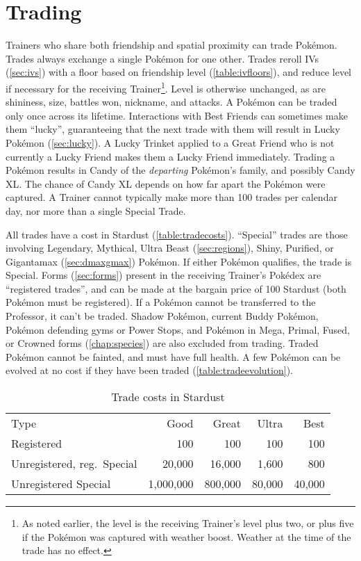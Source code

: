 \section{Trading\label{sec:trades}}
Trainers who share both friendship and spatial proximity can trade Pokémon.
Trades always exchange a single Pokémon for one other.
Trades reroll IVs (\autoref{sec:ivs}) with a floor based on friendship level (\autoref{table:ivfloors}),
  and reduce level if necessary for the receiving Trainer\footnote{As noted earlier, the level is
  the receiving Trainer's level plus two, or plus five if the Pokémon was captured with weather boost.
  Weather at the time of the trade has no effect.}.
Level is otherwise unchanged, as are shininess, size, battles won, nickname, and attacks.
A Pokémon can be traded only once across its lifetime.
Interactions with Best Friends can sometimes make them ``lucky'', guaranteeing that the next trade with
  them will result in Lucky Pokémon (\autoref{sec:lucky}).
A Lucky Trinket applied to a Great Friend who is not currently a Lucky Friend makes them
 a Lucky Friend immediately.
Trading a Pokémon results in Candy of the \textit{departing} Pokémon's family,
  and possibly Candy XL\@.
The chance of Candy XL depends on how far apart the Pokémon were captured.
A Trainer cannot typically make more than 100 trades per calendar day, nor more
 than a single Special Trade.

All trades have a cost in Stardust (\autoref{table:tradecosts}).
``Special'' trades are those involving Legendary, Mythical, Ultra Beast (\autoref{sec:regions}),
  Shiny, Purified, or Gigantamax (\autoref{sec:dmaxgmax}) Pokémon.
If either Pokémon qualifies, the trade is Special.
Forms (\autoref{sec:forms}) present in the receiving Trainer's Pokédex are
  ``registered trades'', and can be made at the bargain price of 100 Stardust
  (both Pokémon must be registered).
If a Pokémon cannot be transferred to the Professor, it can't be traded.
Shadow Pokémon, current Buddy Pokémon, Pokémon defending gyms or Power Stops, and Pokémon
 in Mega, Primal, Fused, or Crowned forms (\autoref{chap:species}) are also excluded from trading.
Traded Pokémon cannot be fainted, and must have full health.
A few Pokémon can be evolved at no cost if they have been traded (\autoref{table:tradeevolution}).
\begin{table}
\centering
\begin{tabular}{lrrrr}
Type & Good & Great & Ultra & Best\\
\Midrule
Registered & 100 & 100 & 100 & 100\\
Unregistered, reg.\ Special & 20,000 & 16,000 & 1,600 & 800\\
Unregistered Special & 1,000,000 & 800,000 & 80,000 & 40,000\\
\end{tabular}
\caption{Trade costs in Stardust\label{table:tradecosts}}
\end{table}

